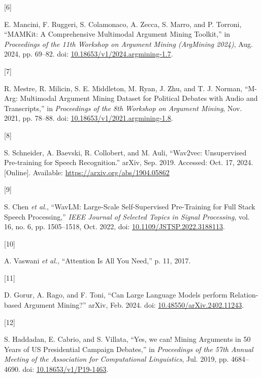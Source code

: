 \documentclass[twocolumn]{article}
\newlength{\cslhangindent}
\newlength{\csllabelwidth}
\newenvironment{CSLReferences}[2] %
 {\begin{list}{}{%
  \setlength{\itemindent}{0pt}
  \setlength{\leftmargin}{0pt}
  \setlength{\parsep}{0pt}
  \ifodd #1
   \setlength{\leftmargin}{\cslhangindent}
   \setlength{\itemindent}{-1\cslhangindent}
  \fi
  \setlength{\itemsep}{#2\baselineskip}}}
 {\end{list}}
\newcommand{\CSLLeftMargin}[1]{\parbox[t]{\csllabelwidth}{\strut#1\strut}}
\newcommand{\CSLRightInline}[1]{\parbox[t]{\linewidth - \csllabelwidth}{\strut#1\strut}}
\begin{document}
\begin{CSLReferences}{0}{0}
\CSLLeftMargin{{[}6{]} }%
\CSLRightInline{E. Mancini, F. Ruggeri, S. Colamonaco, A. Zecca, S.
Marro, and P. Torroni, {``{MAMKit}: {A Comprehensive Multimodal Argument
Mining Toolkit},''} in \emph{Proceedings of the 11th {Workshop} on
{Argument Mining} ({ArgMining} 2024)}, Aug. 2024, pp. 69--82. doi:
\href{https://doi.org/10.18653/v1/2024.argmining-1.7}{10.18653/v1/2024.argmining-1.7}.}

\CSLLeftMargin{{[}7{]} }%
\CSLRightInline{R. Mestre, R. Milicin, S. E. Middleton, M. Ryan, J. Zhu,
and T. J. Norman, {``M-{Arg}: {Multimodal Argument Mining Dataset} for
{Political Debates} with {Audio} and {Transcripts},''} in
\emph{Proceedings of the 8th {Workshop} on {Argument Mining}}, Nov.
2021, pp. 78--88. doi:
\href{https://doi.org/10.18653/v1/2021.argmining-1.8}{10.18653/v1/2021.argmining-1.8}.}

\CSLLeftMargin{{[}8{]} }%
\CSLRightInline{S. Schneider, A. Baevski, R. Collobert, and M. Auli,
{``Wav2vec: {Unsupervised Pre-training} for {Speech Recognition}.''}
arXiv, Sep. 2019. Accessed: Oct. 17, 2024. {[}Online{]}. Available:
\url{https://arxiv.org/abs/1904.05862}}

\CSLLeftMargin{{[}9{]} }%
\CSLRightInline{S. Chen \emph{et al.}, {``{WavLM}: {Large-Scale
Self-Supervised Pre-Training} for {Full Stack Speech Processing},''}
\emph{IEEE Journal of Selected Topics in Signal Processing}, vol. 16,
no. 6, pp. 1505--1518, Oct. 2022, doi:
\href{https://doi.org/10.1109/JSTSP.2022.3188113}{10.1109/JSTSP.2022.3188113}.}

\CSLLeftMargin{{[}10{]} }%
\CSLRightInline{A. Vaswani \emph{et al.}, {``Attention {Is All You
Need},''} p. 11, 2017.}

\CSLLeftMargin{{[}11{]} }%
\CSLRightInline{D. Gorur, A. Rago, and F. Toni, {``Can {Large Language
Models} perform {Relation-based Argument Mining}?''} arXiv, Feb. 2024.
doi:
\href{https://doi.org/10.48550/arXiv.2402.11243}{10.48550/arXiv.2402.11243}.}

\CSLLeftMargin{{[}12{]} }%
\CSLRightInline{S. Haddadan, E. Cabrio, and S. Villata, {``Yes, we can!
{Mining Arguments} in 50 {Years} of {US Presidential Campaign
Debates},''} in \emph{Proceedings of the 57th {Annual Meeting} of the
{Association} for {Computational Linguistics}}, Jul. 2019, pp.
4684--4690. doi:
\href{https://doi.org/10.18653/v1/P19-1463}{10.18653/v1/P19-1463}.}


\end{CSLReferences}
\end{document}
